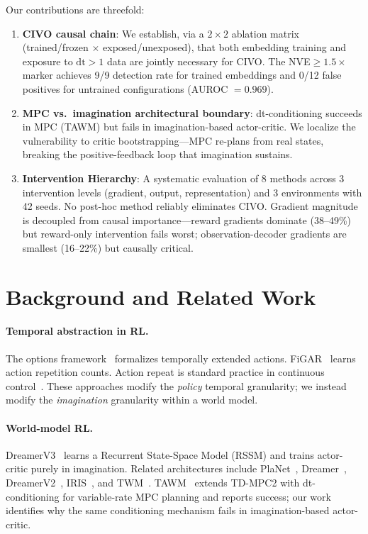 \documentclass[10pt,letterpaper]{article}
\begin{document}
Our contributions are threefold:
\begin{enumerate}[nosep,leftmargin=*]
\item \textbf{CIVO causal chain}: We establish, via a $2\times 2$ ablation matrix (trained/frozen $\times$ exposed/unexposed), that both embedding training and exposure to $\mathrm{dt}>1$ data are jointly necessary for CIVO. The NVE$\geq 1.5\times$ marker achieves 9/9 detection rate for trained embeddings and 0/12 false positives for untrained configurations (AUROC $= 0.969$).
\item \textbf{MPC vs.\ imagination architectural boundary}: dt-conditioning succeeds in MPC (TAWM) but fails in imagination-based actor-critic. We localize the vulnerability to critic bootstrapping---MPC re-plans from real states, breaking the positive-feedback loop that imagination sustains.
\item \textbf{Intervention Hierarchy}: A systematic evaluation of 8 methods across 3 intervention levels (gradient, output, representation) and 3 environments with 42 seeds. No post-hoc method reliably eliminates CIVO. Gradient magnitude is decoupled from causal importance---reward gradients dominate (38--49\%) but reward-only intervention fails worst; observation-decoder gradients are smallest (16--22\%) but causally critical.
\end{enumerate}

\section{Background and Related Work}

\paragraph{Temporal abstraction in RL.}
The options framework~\citep{sutton1999options,precup2000temporal} formalizes temporally extended actions.
FiGAR~\citep{sharma2017figar} learns action repetition counts.
Action repeat is standard practice in continuous control~\citep{hafner2019planet,hafner2020dream}.
These approaches modify the \emph{policy} temporal granularity; we instead modify the \emph{imagination} granularity within a world model.

\paragraph{World-model RL.}
DreamerV3~\citep{hafner2023dreamerv3} learns a Recurrent State-Space Model (RSSM) and trains actor-critic purely in imagination.
Related architectures include PlaNet~\citep{hafner2019planet}, Dreamer~\citep{hafner2020dream}, DreamerV2~\citep{hafner2021dreamerv2}, IRIS~\citep{micheli2023iris}, and TWM~\citep{robine2023twm}.
TAWM~\citep{nhu2025tawm} extends TD-MPC2 with dt-conditioning for variable-rate MPC planning and reports success; our work identifies why the same conditioning mechanism fails in imagination-based actor-critic.
\end{document}
